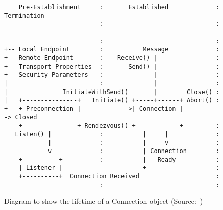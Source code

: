\begin{figure}
    \begin{verbatim}
    Pre-Establishment     :       Established             : Termination
    -----------------     :       -----------             : -----------
                          :                               :
+-- Local Endpoint        :           Message             :
+-- Remote Endpoint       :    Receive() |                :
+-- Transport Properties  :       Send() |                :
+-- Security Parameters   :              |                :
|                         :              |                :
|               InitiateWithSend()       |        Close() :
|   +---------------+   Initiate() +-----+------+ Abort() :
+---+ Preconnection |------------->| Connection |-----------> Closed
    +---------------+ Rendezvous() +------------+         :
   Listen() |             :           |     |             :
            |             :           |     v             :
            v             :           | Connection        :
    +----------+          :           |   Ready           :
    | Listener |----------------------+                   :
    +----------+  Connection Received                     :
                          :                               :
    \end{verbatim}
    \caption{Diagram to show the lifetime of a Connection object
            (Source:~\citet[fig:4]{pauly_architecturetransportservices_2020})}
    \label{fig:tapsConLife}
\end{figure}


